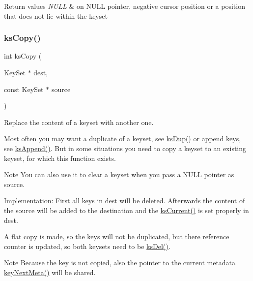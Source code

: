 \begin{DoxyRetVals}{Return values}
{\em N\+U\+LL} & on N\+U\+LL pointer, negative cursor position or a position that does not lie within the keyset \\
\hline
\end{DoxyRetVals}
\mbox{\label{group__keyset_gaba1f1dbea191f4d7e7eb3e4296ae7d5e}} 
\subsubsection{\texorpdfstring{ks\+Copy()}{ksCopy()}}
{\footnotesize\ttfamily int ks\+Copy (\begin{DoxyParamCaption}\item[{Key\+Set $\ast$}]{dest,  }\item[{const Key\+Set $\ast$}]{source }\end{DoxyParamCaption})}



Replace the content of a keyset with another one. 

Most often you may want a duplicate of a keyset, see \hyperlink{group__keyset_gac59e4b328245463f1451f68d5106151c}{ks\+Dup()} or append keys, see \hyperlink{group__keyset_ga21eb9c3a14a604ee3a8bdc779232e7b7}{ks\+Append()}. But in some situations you need to copy a keyset to an existing keyset, for which this function exists.

\begin{DoxyNote}{Note}
You can also use it to clear a keyset when you pass a N\+U\+LL pointer as {\ttfamily source}.
\end{DoxyNote}
\begin{DoxyParagraph}{Implementation\+:}
First all keys in {\ttfamily dest} will be deleted. Afterwards the content of the source will be added to the destination and the \hyperlink{group__keyset_ga4287b9416912c5f2ab9c195cb74fb094}{ks\+Current()} is set properly in {\ttfamily dest}.
\end{DoxyParagraph}
A flat copy is made, so the keys will not be duplicated, but there reference counter is updated, so both keysets need to be \hyperlink{group__keyset_ga27e5c16473b02a422238c8d970db7ac8}{ks\+Del()}.

\begin{DoxyNote}{Note}
Because the key is not copied, also the pointer to the current metadata \hyperlink{group__keymeta_ga4c88342f580a4291455a801af71ce048}{key\+Next\+Meta()} will be shared.
\end{DoxyNote}

